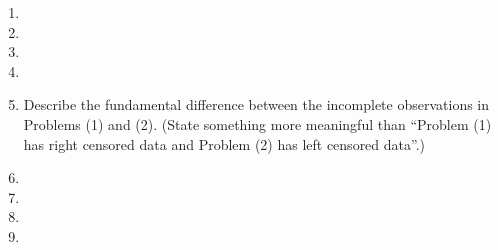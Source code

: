 \begin{enumerate}
\begin{enumerate}
\item[]
\item[]
\item[]
\item[]
\item Describe the fundamental difference between the incomplete observations in Problems (1) and (2). (State something more meaningful than ``Problem (1) has right censored data and Problem (2) has left censored data''.)
\item[]
\item[]
\item[]
\item[]
\end{enumerate}
\end{enumerate}




